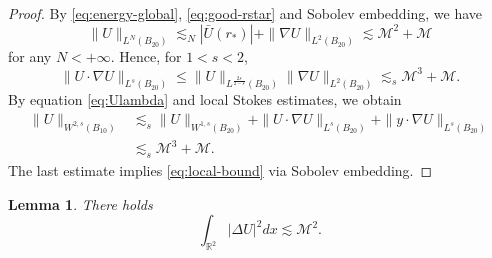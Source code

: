 \documentclass[12pt,reqno]{amsart}
\theoremstyle{plain}
\newtheorem{lemma}[theorem]{Lemma}
\theoremstyle{definition}
\newcommand{\R}{\mathbb{R}}
\newcommand{\M}{\mathcal{M}}
\renewcommand{\:}{\colon}
\numberwithin{equation}{section}
\numberwithin{figure}{section}
\begin{document}
\begin{proof}
	By \eqref{eq:energy-global}, \eqref{eq:good-rstar} and Sobolev embedding, we have
	\begin{equation}
		\|U\|_{L^N(B_{20})} \lesssim_N |\bar{U}(r_*)| + 	\|\nabla U\|_{L^2(B_{20})} \lesssim \M^2 + \M 
	\end{equation}
	for any $N< +\infty$. Hence,   for $1<s<2$,
	\begin{equation}
		\|U\cdot \nabla U\|_{L^s(B_{20})} \le \|U\|_{L^{\frac{2s}{2-s}}(B_{20})} \|\nabla U\|_{L^2(B_{20})}  \lesssim_s \M^3 + \M.
	\end{equation}
	By equation \eqref{eq:Ulambda} and local Stokes estimates, we obtain
	\begin{align}
		\|U\|_{W^{2,s}(B_{10})} &\lesssim_s \|U\|_{W^{1,s}(B_{20})} + \|U\cdot \nabla U\|_{L^s(B_{20})} + \| y \cdot \nabla U\|_{L^s(B_{20})} \nonumber \\ &\lesssim_s \M^3 + \M.
	\end{align}
	The last estimate implies \eqref{eq:local-bound} via Sobolev embedding.
	
\end{proof}


\begin{lemma}\label{vort-est}
There holds
		        \begin{equation} \label{eq:Delta-U-sq}
			\int_{\R^2} |\Delta U|^2 dx \lesssim \M^2.
		\end{equation}
\end{lemma}
\end{document}
